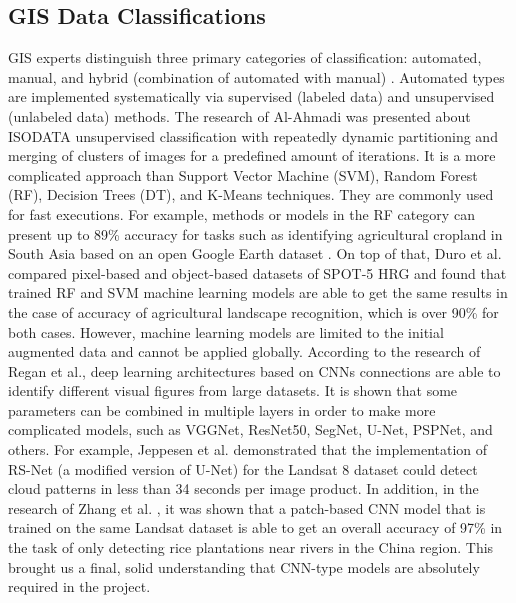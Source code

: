 \documentclass[3p,times,procedia]{elsarticle}
\begin{document}
\subsection{GIS Data Classifications}
GIS experts distinguish three primary categories of classification: automated, manual, and hybrid (combination of automated with manual) \cite{Horning2004}. Automated types are implemented systematically via supervised (labeled data) and unsupervised (unlabeled data) methods. The research of Al-Ahmadi \cite{Al-Ahmadi2009} was presented about ISODATA unsupervised classification with repeatedly dynamic partitioning and merging of clusters of images for a predefined amount of iterations. It is a more complicated approach than Support Vector Machine (SVM), Random Forest (RF), Decision Trees (DT), and K-Means techniques. They are commonly used for fast executions. For example, methods or models in the RF category can present up to 89\% accuracy for tasks such as identifying agricultural cropland in South Asia based on an open Google Earth dataset \cite{Gumma2019}. On top of that, Duro et al. \cite{Duro2012} compared pixel-based and object-based datasets of SPOT-5 HRG and found that trained RF and SVM machine learning models are able to get the same results in the case of accuracy of agricultural landscape recognition, which is over 90\% for both cases. However, machine learning models are limited to the initial augmented data and cannot be applied globally. According to the research of Regan et al.\cite{Bhatnagar2020}, deep learning architectures based on CNNs connections are able to identify different visual figures from large datasets. It is shown that some parameters can be combined in multiple layers in order to make more complicated models, such as VGGNet, ResNet50, SegNet, U-Net, PSPNet, and others. For example, Jeppesen et al. \cite{Jeppesen2019} demonstrated that the implementation of RS-Net (a modified version of U-Net) for the Landsat 8 dataset could detect cloud patterns in less than 34 seconds per image product. In addition, in the research of Zhang et al. \cite{Zhang2018}, it was shown that a patch-based CNN model that is trained on the same Landsat dataset is able to get an overall accuracy of 97\% in the task of only detecting rice plantations near rivers in the China region. This brought us a final, solid understanding that CNN-type models are absolutely required in the project.
\end{document}
